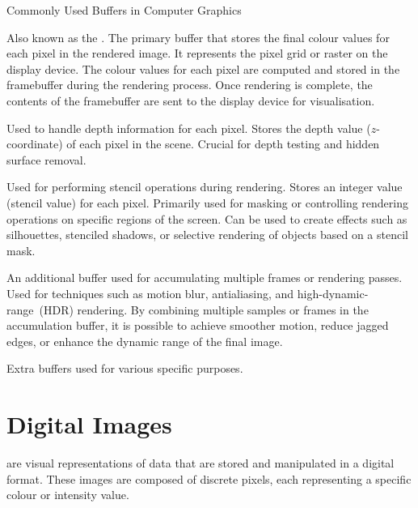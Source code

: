 \documentclass[../COS3712_Notes.tex]{subfiles}
\begin{document}
      \begin{sidenote}{Commonly Used Buffers in Computer Graphics}
        $ $\vspace{-1em}
        \begin{descriptimize}
          \item[Frame Buffer] Also known as the .
            The primary buffer that stores the final colour values for each pixel in the
            rendered image.
            It represents the pixel grid or raster on the display device.
            The colour values for each pixel are computed and stored in the framebuffer
            during the rendering process.
            Once rendering is complete, the contents of the framebuffer are sent to the
            display device for visualisation.
          \item[Depth Buffer ($z$-Buffer)] Used to handle depth information for each pixel.
            Stores the depth value ($z$-coordinate) of each pixel in the scene.
            Crucial for depth testing and hidden surface removal.
          \item[Stencil Buffer] Used for performing stencil operations during rendering.
            Stores an integer value (stencil value) for each pixel.
            Primarily used for masking or controlling rendering operations on specific
            regions of the screen.
            Can be used to create effects such as silhouettes, stenciled shadows,
            or selective rendering of objects based on a stencil mask.
          \item[Accumulation Buffer] An additional buffer used for accumulating multiple frames
            or rendering passes.
            Used for techniques such as motion blur, antialiasing, and high-dynamic-range~(HDR)
            rendering.
            By combining multiple samples or frames in the accumulation buffer,
            it is possible to achieve smoother motion, reduce jagged edges,
            or enhance the dynamic range of the final image.
          \item[Auxiliary Buffers] Extra buffers used for various specific purposes.
        \end{descriptimize}
      \end{sidenote}

    \section{Digital Images}
       are visual representations of data that are stored and manipulated
      in a digital format.
      These images are composed of discrete pixels, each representing a specific colour or
      intensity value.
\end{document}
